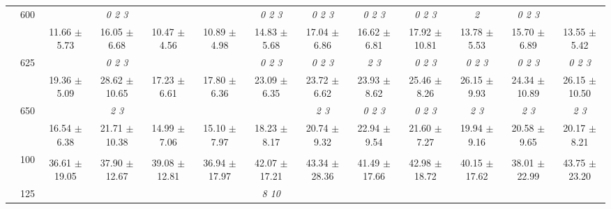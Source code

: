 \begin{table}[h]
{\begin{tabular}{
        ccccccccccccc}
 & \multirow{2}{*}{600}& & \textit{ 0 2 3 }& & & \textit{ 0 2 3 }& \textit{ 0 2 3 }& \textit{ 0 2 3 }& \textit{ 0 2 3 }& \textit{ 2 }& \textit{ 0 2 3 }&  \\ 
 & & 11.66 $\pm$ 5.73& 16.05 $\pm$ 6.68& 10.47 $\pm$ 4.56& 10.89 $\pm$ 4.98& 14.83 $\pm$ 5.68& 17.04 $\pm$ 6.86& 16.62 $\pm$ 6.81& 17.92 $\pm$ 10.81& 13.78 $\pm$ 5.53& 15.70 $\pm$ 6.89& 13.55 $\pm$ 5.42 \\ 
 & \multirow{2}{*}{625}& \cellcolor[HTML]{EFEFEF} & \cellcolor[HTML]{EFEFEF} \textit{ 0 2 3 }& \cellcolor[HTML]{EFEFEF} & \cellcolor[HTML]{EFEFEF} & \cellcolor[HTML]{EFEFEF} \textit{ 0 2 3 }& \cellcolor[HTML]{EFEFEF} \textit{ 0 2 3 }& \cellcolor[HTML]{EFEFEF} \textit{ 2 3 }& \cellcolor[HTML]{EFEFEF} \textit{ 0 2 3 }& \cellcolor[HTML]{EFEFEF} \textit{ 0 2 3 }& \cellcolor[HTML]{EFEFEF} \textit{ 0 2 3 }& \cellcolor[HTML]{EFEFEF} \textit{ 0 2 3 } \\ 
 & & \cellcolor[HTML]{EFEFEF} 19.36 $\pm$ 5.09& \cellcolor[HTML]{EFEFEF} 28.62 $\pm$ 10.65& \cellcolor[HTML]{EFEFEF} 17.23 $\pm$ 6.61& \cellcolor[HTML]{EFEFEF} 17.80 $\pm$ 6.36& \cellcolor[HTML]{EFEFEF} 23.09 $\pm$ 6.35& \cellcolor[HTML]{EFEFEF} 23.72 $\pm$ 6.62& \cellcolor[HTML]{EFEFEF} 23.93 $\pm$ 8.62& \cellcolor[HTML]{EFEFEF} 25.46 $\pm$ 8.26& \cellcolor[HTML]{EFEFEF} 26.15 $\pm$ 9.93& \cellcolor[HTML]{EFEFEF} 24.34 $\pm$ 10.89& \cellcolor[HTML]{EFEFEF} 26.15 $\pm$ 10.50 \\ 
 & \multirow{2}{*}{650}& & \textit{ 2 3 }& & & & \textit{ 2 3 }& \textit{ 0 2 3 }& \textit{ 0 2 3 }& \textit{ 2 3 }& \textit{ 2 3 }& \textit{ 2 3 } \\ 
 & & 16.54 $\pm$ 6.38& 21.71 $\pm$ 10.38& 14.99 $\pm$ 7.06& 15.10 $\pm$ 7.97& 18.23 $\pm$ 8.17& 20.74 $\pm$ 9.32& 22.94 $\pm$ 9.54& 21.60 $\pm$ 7.27& 19.94 $\pm$ 9.16& 20.58 $\pm$ 9.65& 20.17 $\pm$ 8.21 \\ \midrule 
 & \multirow{2}{*}{100}& & & & & & & & & & &  \\ 
 & & 36.61 $\pm$ 19.05& 37.90 $\pm$ 12.67& 39.08 $\pm$ 12.81& 36.94 $\pm$ 17.97& 42.07 $\pm$ 17.21& 43.34 $\pm$ 28.36& 41.49 $\pm$ 17.66& 42.98 $\pm$ 18.72& 40.15 $\pm$ 17.62& 38.01 $\pm$ 22.99& 43.75 $\pm$ 23.20 \\ 
 & \multirow{2}{*}{125}& \cellcolor[HTML]{EFEFEF} & \cellcolor[HTML]{EFEFEF} & \cellcolor[HTML]{EFEFEF} & \cellcolor[HTML]{EFEFEF} & \cellcolor[HTML]{EFEFEF} \textit{  8 10 }& \cellcolor[HTML]{EFEFEF} & \cellcolor[HTML]{EFEFEF} & \cellcolor[HTML]{EFEFEF} & \cellcolor[HTML]{EFEFEF} & \cellcolor[HTML]{EFEFEF} & \cellcolor[HTML]{EFEFEF}  \\ 

\end{tabular}}
\end{table}
